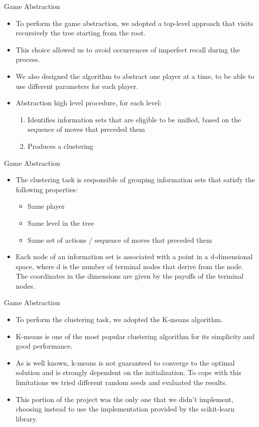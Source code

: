 \documentclass[11pt]{beamer}
\begin{document}
\begin{frame}{Game Abstraction}
\begin{itemize}
\item To perform the game abstraction, we adopted a top-level approach that visits recursively the tree starting from the root. 
\item This choice allowed us to avoid occurrences of imperfect recall during the process.
\item We also designed the algorithm to abstract one player at a time, to be able to use different parameters for each player.
\item Abstraction high level procedure, for each level:
\begin{enumerate}
\item Identifies information sets that are eligible to be unified, based on the sequence of moves that preceded them
\item Produces a clustering
\end{enumerate}
\end{itemize}
\end{frame}

\begin{frame}{Game Abstraction}
\begin{itemize}
\item The clustering task is responsible of grouping information sets that satisfy the following properties:
\begin{itemize}
\item Same player
\item Same level in the tree
\item Same set of actions / sequence of moves that preceded them
\end{itemize}
\item Each node of an information set is associated with a point in a d-dimensional space, where d is the number of terminal nodes that derive from the node. The coordinates in the dimensions are given by the payoffs of the terminal nodes.
\end{itemize}
\end{frame}

\begin{frame}{Game Abstraction}
\begin{itemize}
\item To perform the clustering task, we adopted the K-means algorithm.
\item K-means is one of the most popular clustering algorithm for its simplicity and good performance.
\item As is well known, k-means is not guaranteed to converge to the optimal solution and is strongly dependent on the initialization. To cope with this limitations we tried different random seeds and evaluated the results. 
\item This portion of the project was the only one that we didn't implement, choosing instead to use the implementation provided by the scikit-learn library.
\end{itemize}
\end{frame}
\end{document}
